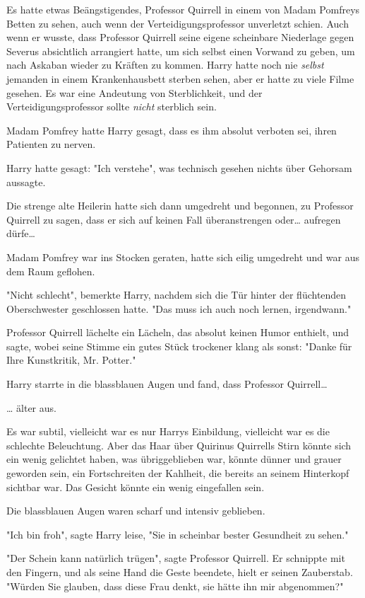 {Es hatte etwas Beängstigendes, Professor Quirrell in einem von Madam Pomfreys Betten zu sehen, auch wenn der Verteidigungsprofessor unverletzt schien. Auch wenn er wusste, dass Professor Quirrell seine eigene scheinbare Niederlage gegen Severus absichtlich arrangiert hatte, um sich selbst einen Vorwand zu geben, um nach Askaban wieder zu Kräften zu kommen. Harry hatte noch nie \emph{selbst} jemanden in einem Krankenhausbett sterben sehen, aber er hatte zu viele Filme gesehen. Es war eine Andeutung von Sterblichkeit, und der Verteidigungsprofessor sollte \emph{nicht} sterblich sein.

Madam Pomfrey hatte Harry gesagt, dass es ihm absolut verboten sei, ihren Patienten zu nerven.

Harry hatte gesagt: "Ich verstehe", was technisch gesehen nichts über Gehorsam aussagte.

Die strenge alte Heilerin hatte sich dann umgedreht und begonnen, zu Professor Quirrell zu sagen, dass er sich auf keinen Fall überanstrengen oder… aufregen dürfe…

Madam Pomfrey war ins Stocken geraten, hatte sich eilig umgedreht und war aus dem Raum geflohen.

"Nicht schlecht", bemerkte Harry, nachdem sich die Tür hinter der flüchtenden Oberschwester geschlossen hatte. "Das muss ich auch noch lernen, irgendwann."

Professor Quirrell lächelte ein Lächeln, das absolut keinen Humor enthielt, und sagte, wobei seine Stimme ein gutes Stück trockener klang als sonst: "Danke für Ihre Kunstkritik, Mr. Potter."

Harry starrte in die blassblauen Augen und fand, dass Professor Quirrell…

… älter aus.

Es war subtil, vielleicht war es nur Harrys Einbildung, vielleicht war es die schlechte Beleuchtung. Aber das Haar über Quirinus Quirrells Stirn könnte sich ein wenig gelichtet haben, was übriggeblieben war, könnte dünner und grauer geworden sein, ein Fortschreiten der Kahlheit, die bereits an seinem Hinterkopf sichtbar war. Das Gesicht könnte ein wenig eingefallen sein.

Die blassblauen Augen waren scharf und intensiv geblieben.

"Ich bin froh", sagte Harry leise, "Sie in scheinbar bester Gesundheit zu sehen."

"Der Schein kann natürlich trügen", sagte Professor Quirrell. Er schnippte mit den Fingern, und als seine Hand die Geste beendete, hielt er seinen Zauberstab. "Würden Sie glauben, dass diese Frau denkt, sie hätte ihn mir abgenommen?"

}
